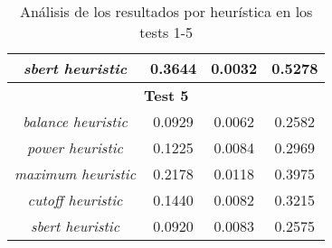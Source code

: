 \documentclass{article}
\begin{document}
\begin{table}[H]
{\begin{tabular}{|c|c|c|c|}
\textit{sbert heuristic} & 0.3644 & 0.0032 & 0.5278 \\ \hline
\multicolumn{4}{|c|}{\textbf{Test 5}} \\ \hline
\textit{balance heuristic} & 0.0929 & 0.0062 & 0.2582 \\ \hline
\textit{power heuristic} & 0.1225 & 0.0084 & 0.2969 \\ \hline
\textit{maximum heuristic} & 0.2178 & 0.0118 & 0.3975 \\ \hline
\textit{cutoff heuristic} & 0.1440 & 0.0082 & 0.3215 \\ \hline
\textit{sbert heuristic} & 0.0920 & 0.0083 & 0.2575 \\ \hline
\end{tabular}%
}
\caption{Análisis de los resultados por heurística en los tests 1-5}
\end{table}
\end{document}
